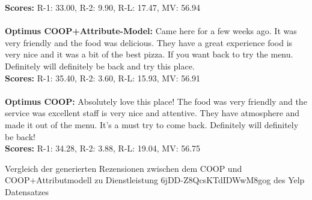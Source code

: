\begin{Rezension}[!h]
{{        \textbf{Scores:} R-1: 33.00, R-2: 9.90, R-L: 17.47, MV: 56.94 \\ \\

        \textbf{Optimus COOP+Attribute-Model:} Came here for \textcolor{HighlightColor}{a} few weeks ago\textcolor{HighlightColor}{.} It was very friendly \textcolor{HighlightColor}{and} \textcolor{HighlightColor}{the} \textcolor{HighlightColor}{food} was delicious\textcolor{HighlightColor}{.} They \textcolor{HighlightColor}{have} \textcolor{HighlightColor}{a} great experience\underline{\ccolorbox[BackgroundColor]{\textcolor{HighlightColor}{. The}}} \textcolor{HighlightColor}{food} \textcolor{HighlightColor}{is} very \textcolor{HighlightColor}{nice} \textcolor{HighlightColor}{and} it was \textcolor{HighlightColor}{a} bit \textcolor{HighlightColor}{of} \textcolor{HighlightColor}{the} best pizza\textcolor{HighlightColor}{.} If you want \ccolorbox[BackgroundColor]{ \textcolor{HighlightColor}{to go}} back \textcolor{HighlightColor}{to} try \textcolor{HighlightColor}{the} menu\textcolor{HighlightColor}{.} Definitely will definitely \textcolor{HighlightColor}{be} back \textcolor{HighlightColor}{and} try this \textcolor{HighlightColor}{place}\textcolor{HighlightColor}{.}         \\ 
        \textbf{Scores:} R-1: 35.40, R-2: 3.60, R-L: 15.93, MV: 56.91 \\ \\
        \textbf{Optimus COOP:} Absolutely love this \textcolor{HighlightColor}{place}! \textcolor{HighlightColor}{The} \textcolor{HighlightColor}{food} was very friendly \textcolor{HighlightColor}{and} \textcolor{HighlightColor}{the} service was excellent\ccolorbox[BackgroundColor]{\textcolor{HighlightColor}{. The}} staff \textcolor{HighlightColor}{is} very \textcolor{HighlightColor}{nice} \textcolor{HighlightColor}{and} attentive\textcolor{HighlightColor}{.} They \textcolor{HighlightColor}{have} \underline{\ccolorbox[BackgroundColor]{ \textcolor{HighlightColor}{a nice}}} \textcolor{HighlightColor}{atmosphere} \textcolor{HighlightColor}{and} made it out \textcolor{HighlightColor}{of} \textcolor{HighlightColor}{the} menu\textcolor{HighlightColor}{.} It's \textcolor{HighlightColor}{a} must try \textcolor{HighlightColor}{to} come back\textcolor{HighlightColor}{.} Definitely will definitely \textcolor{HighlightColor}{be} back!         \\ 
        \textbf{Scores:} R-1: 34.28, R-2: 3.88, R-L: 19.04, MV: 56.75  
        }
    }
    \caption{Vergleich der generierten Rezensionen zwischen dem COOP und COOP+Attributmodell zu Dienstleistung 6jDD-Z8QcsKTdIDWwM8gog des Yelp Datensatzes}
    \label{reviewYelp2}
\end{Rezension}


